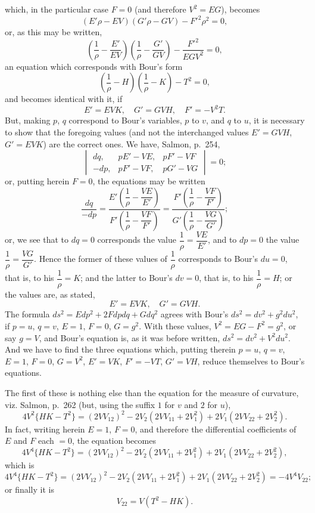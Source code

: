\documentclass[11pt,a4paper]{article}
\theoremstyle{definition}
\begin{document}
which, in the particular case $F = 0$ (and therefore $V^2 = EG$), becomes
\[
(E'\rho - EV)(G'\rho - GV) - F'^2\rho^2 = 0,
\]
or, as this may be written,
\[
\left(\frac{1}{\rho} - \frac{E'}{EV}\right)\left(\frac{1}{\rho} - \frac{G'}{GV}\right) - \frac{F'^2}{EGV^2} = 0,
\]
an equation which corresponds with Bour's form
\[
\left(\frac{1}{\rho} - H\right)\left(\frac{1}{\rho} - K\right) - T^2 = 0,
\]
and becomes identical with it, if
\[
E' = EVK,\quad G' = GVH,\quad F' = -V^2T.
\]
But, making $p$, $q$ correspond to Bour's variables, $p$ to $v$, and $q$ to $u$, it is necessary to show that the foregoing values (and not the interchanged values $E' = GVH$, $G' = EVK$) are the correct ones. We have, Salmon, p.~254,
\[
\begin{vmatrix}
dq, & pE' - VE, & pF' - VF \\
-dp, & pF' - VF, & pG' - VG
\end{vmatrix}
= 0;
\]
or, putting herein $F = 0$, the equations may be written
\[
\frac{dq}{-dp} = \frac{E'\left(\dfrac{1}{\rho} - \dfrac{VE}{E'}\right)}{F'\left(\dfrac{1}{\rho} - \dfrac{VF}{F'}\right)} = \frac{F'\left(\dfrac{1}{\rho} - \dfrac{VF}{F'}\right)}{G'\left(\dfrac{1}{\rho} - \dfrac{VG}{G'}\right)};
\]
or, we see that to $dq = 0$ corresponds the value $\dfrac{1}{\rho} = \dfrac{VE}{E'}$, and to $dp = 0$ the value $\dfrac{1}{\rho} = \dfrac{VG}{G'}$. Hence the former of these values of $\dfrac{1}{\rho}$ corresponds to Bour's $du = 0$, that is, to his $\dfrac{1}{\rho} = K$; and the latter to Bour's $dv = 0$, that is, to his $\dfrac{1}{\rho} = H$; or the values are, as stated,
\[
E' = EVK,\quad G' = GVH.
\]
The formula $ds^2 = Edp^2 + 2Fdpdq + Gdq^2$ agrees with Bour's $ds^2 = dv^2 + g^2 du^2$, if $p = u$, $q = v$, $E = 1$, $F = 0$, $G = g^2$. With these values, $V^2 = EG - F^2 = g^2$, or say $g = V$, and Bour's equation is, as it was before written, $ds^2 = dv^2 + V^2 du^2$. And we have to find the three equations which, putting therein $p = u$, $q = v$, $E = 1$, $F = 0$, $G = V^2$, $E' = VK$, $F' = -VT$, $G' = VH$, reduce themselves to Bour's equations.

The first of these is nothing else than the equation for the measure of curvature, viz. Salmon, p.~262 (but, using the suffix $1$ for $v$ and $2$ for $u$),
\[
4V^2\{HK - T^2\} = (2VV_{12})^2 - 2V_2(2VV_{11} + 2V_1^2) + 2V_1(2VV_{22} + 2V_2^2).
\]
In fact, writing herein $E = 1$, $F = 0$, and therefore the differential coefficients of $E$ and $F$ each $= 0$, the equation becomes
\[
4V^4\{HK - T^2\} = (2VV_{12})^2 - 2V_2(2VV_{11} + 2V_1^2) + 2V_1(2VV_{22} + 2V_2^2),
\]
which is
\[
4V^4\{HK - T^2\} = (2VV_{12})^2 - 2V_2(2VV_{11} + 2V_1^2) + 2V_1(2VV_{22} + 2V_2^2) = -4V^4V_{22};
\]
or finally it is
\[
V_{22} = V(T^2 - HK).
\]
\end{document}
